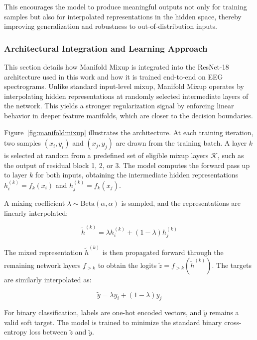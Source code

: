 This encourages the model to produce meaningful outputs not only for training samples but also for interpolated representations in the hidden space, thereby improving generalization and robustness to out-of-distribution inputs.

\subsubsection{Architectural Integration and Learning Approach}
This section details how Manifold Mixup is integrated into the ResNet-18 architecture used in this work and how it is trained end-to-end on EEG spectrograms. Unlike standard input-level mixup, Manifold Mixup operates by interpolating hidden representations at randomly selected intermediate layers of the network. This yields a stronger regularization signal by enforcing linear behavior in deeper feature manifolds, which are closer to the decision boundaries.

Figure~\ref{fig:manifoldmixup} illustrates the architecture. At each training iteration, two samples \((x_i, y_i)\) and \((x_j, y_j)\) are drawn from the training batch. A layer \(k\) is selected at random from a predefined set of eligible mixup layers \(\mathcal{K}\), such as the output of residual block 1, 2, or 3. The model computes the forward pass up to layer \(k\) for both inputs, obtaining the intermediate hidden representations \(h_i^{(k)} = f_k(x_i)\) and \(h_j^{(k)} = f_k(x_j)\).

A mixing coefficient \(\lambda \sim \text{Beta}(\alpha, \alpha)\) is sampled, and the representations are linearly interpolated:

\begin{equation}
\tilde{h}^{(k)} = \lambda h_i^{(k)} + (1 - \lambda) h_j^{(k)}
\end{equation}

The mixed representation \(\tilde{h}^{(k)}\) is then propagated forward through the remaining network layers \(f_{>k}\) to obtain the logits \(\tilde{z} = f_{>k}(\tilde{h}^{(k)})\). The targets are similarly interpolated as:

\begin{equation}
\tilde{y} = \lambda y_i + (1 - \lambda) y_j
\end{equation}

For binary classification, labels are one-hot encoded vectors, and \(\tilde{y}\) remains a valid soft target. The model is trained to minimize the standard binary cross-entropy loss between \(\tilde{z}\) and \(\tilde{y}\).

